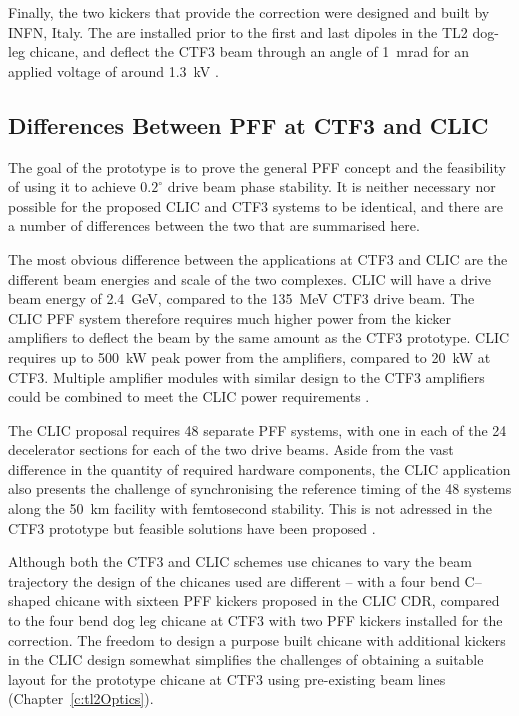 Finally, the two kickers that provide the correction were designed and built by INFN, Italy. The are installed prior to the first and last dipoles in the TL2 dog-leg chicane, and deflect the CTF3 beam through an angle of 1~mrad for an applied voltage of around 1.3~kV \cite{kickerIPAC11}.


\subsection{Differences Between PFF at CTF3 and CLIC}
\label{ss:ctfVsCLIC}

The goal of the prototype is to prove the general PFF concept and the feasibility of using it to achieve \(0.2^\circ\) drive beam phase stability. It is neither necessary nor possible for the proposed CLIC and CTF3 systems to be identical, and there are a number of differences between the two that are summarised here. 

The most obvious difference between the applications at CTF3 and CLIC are the different beam energies and scale of the two complexes. CLIC will have a drive beam energy of 2.4~GeV, compared to the 135~MeV CTF3 drive beam. The CLIC PFF system therefore requires much higher power from the kicker amplifiers to deflect the beam by the same amount as the CTF3 prototype. CLIC requires up to 500~kW peak power from the amplifiers, compared to 20~kW at CTF3. Multiple amplifier modules with similar design to the CTF3 amplifiers could be combined to meet the CLIC power requirements \cite{colinCLIC16}.

The CLIC proposal requires 48 separate PFF systems, with one in each of the 24 decelerator sections for each of the two drive beams. Aside from the vast difference in the quantity of required hardware components, the CLIC application also presents the challenge of synchronising the reference timing of the 48 systems along the 50~km facility with femtosecond stability. This is not adressed in the CTF3 prototype but feasible solutions have been proposed \cite{clicCDR}.

Although both the CTF3 and CLIC schemes use chicanes to vary the beam trajectory the design of the chicanes used are different -- with a four bend C--shaped chicane with sixteen PFF kickers proposed in the CLIC CDR, compared to the four bend dog leg chicane at CTF3 with two PFF kickers installed for the correction. The freedom to design a purpose built chicane with additional kickers in the CLIC design somewhat simplifies the challenges of obtaining a suitable layout for the prototype chicane at CTF3 using pre-existing beam lines (Chapter~\ref{c:tl2Optics}).

